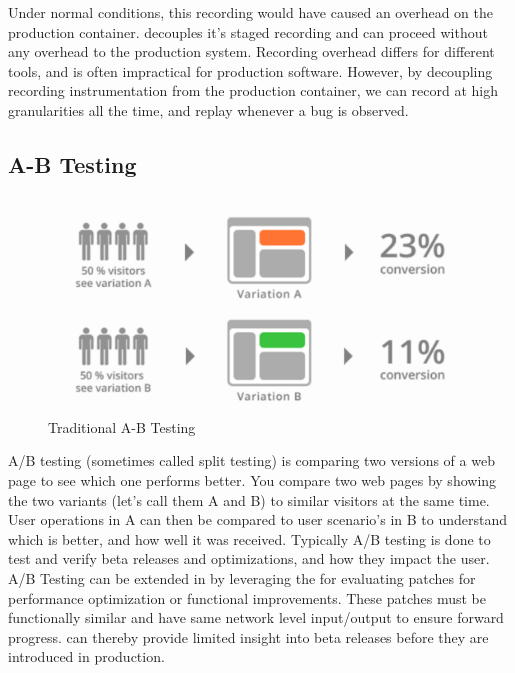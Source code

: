 Under normal conditions, this recording would have caused an overhead on the production container. 
\parikshan decouples it's staged recording and can proceed without any overhead to the production system.
Recording overhead differs for different tools, and is often impractical for production software. 
However, by decoupling recording instrumentation from the production container, we can record at high granularities all the time, and replay whenever a bug is observed.

\subsection{A-B Testing}

\begin{figure}[h!]
	
	\centering
	\includegraphics[width=0.99\textwidth]{guided/figs/ABTesting.pdf}
	\caption{Traditional A-B Testing}
	\label{fig:abTesting}
\end{figure}

A/B testing (sometimes called split testing) is comparing two versions of a web page to see which one performs better. 
You compare two web pages by showing the two variants (let's call them A and B) to similar visitors at the same time.
User operations in A can then be compared to user scenario's in B to understand which is better, and how well it was received.
Typically A/B testing is done to test and verify beta releases and optimizations, and how they impact the user.
A/B Testing can be extended in \parikshan by leveraging the \debugcontainer  for evaluating patches for performance optimization or functional improvements. 
These patches must be functionally similar and have same network level input/output to ensure forward progress.
\parikshan can thereby provide limited insight into beta releases before they are introduced in production. 


